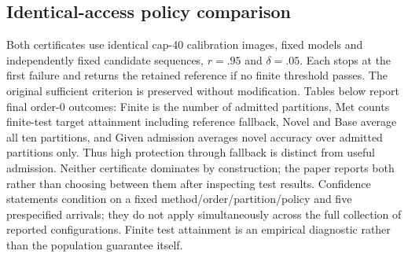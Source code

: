 \documentclass[preprint,review,12pt]{elsarticle}
\begin{document}
\subsection{Identical-access policy comparison}
Both certificates use identical cap-40 calibration images, fixed models and independently fixed candidate sequences, $r=.95$ and $\delta=.05$. Each stops at the first failure and returns the retained reference if no finite threshold passes. The original sufficient criterion is preserved without modification. Tables below report final order-0 outcomes: Finite is the number of admitted partitions, Met counts finite-test target attainment including reference fallback, Novel and Base average all ten partitions, and Given admission averages novel accuracy over admitted partitions only. Thus high protection through fallback is distinct from useful admission. Neither certificate dominates by construction; the paper reports both rather than choosing between them after inspecting test results. Confidence statements condition on a fixed method/order/partition/policy and five prespecified arrivals; they do not apply simultaneously across the full collection of reported configurations. Finite test attainment is an empirical diagnostic rather than the population guarantee itself.
\begin{table}[htbp]
\centering\setlength{\belowcaptionskip}{8pt}
\caption{L14, CIFAR-100: sufficient protection and direct paired accuracy calibration. Accuracy columns are percentages; both admission and fallback are explicit.}
\resizebox{\linewidth}{!}{}
\end{table}
\begin{table}[htbp]
\centering\setlength{\belowcaptionskip}{8pt}
\caption{L14, Pets: sufficient protection and direct paired accuracy calibration. Accuracy columns are percentages; both admission and fallback are explicit.}
\resizebox{\linewidth}{!}{}
\end{table}
\begin{table}[htbp]
\centering\setlength{\belowcaptionskip}{8pt}
\caption{L14, ImageNet-R: sufficient protection and direct paired accuracy calibration. Accuracy columns are percentages; both admission and fallback are explicit.}
\resizebox{\linewidth}{!}{}
\end{table}
\begin{table}[htbp]
\centering\setlength{\belowcaptionskip}{8pt}
\caption{B32, CIFAR-100: sufficient protection and direct paired accuracy calibration. Accuracy columns are percentages; both admission and fallback are explicit.}
\resizebox{\linewidth}{!}{}
\end{table}
\end{document}
